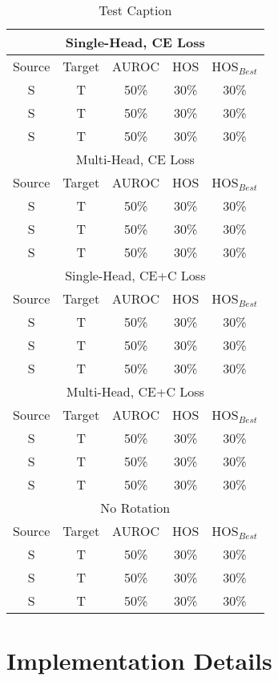 \documentclass[10pt,twocolumn,letterpaper]{article}
\begin{document}
\begin{table}
  \centering
  \begin{tabular}[t]{||c|c|c||c|c||}
    \hline
    \multicolumn{5}{||c||}{Single-Head, CE Loss} \\
    \hline
    Source & Target & AUROC & HOS & HOS$_{Best}$ \\
    S & T & 50\% & 30\% & 30\% \\
    S & T & 50\% & 30\% & 30\% \\
    S & T & 50\% & 30\% & 30\% \\
    \hline
    \hline
    \multicolumn{5}{||c||}{Multi-Head, CE Loss} \\
    \hline
    Source & Target & AUROC & HOS & HOS$_{Best}$ \\
    S & T & 50\% & 30\% & 30\% \\
    S & T & 50\% & 30\% & 30\% \\
    S & T & 50\% & 30\% & 30\% \\
    \hline
    \hline
    \multicolumn{5}{||c||}{Single-Head, CE+C Loss} \\
    \hline
    Source & Target & AUROC & HOS & HOS$_{Best}$ \\
    S & T & 50\% & 30\% & 30\% \\
    S & T & 50\% & 30\% & 30\% \\
    S & T & 50\% & 30\% & 30\% \\
    \hline
    \hline
    \multicolumn{5}{||c||}{Multi-Head, CE+C Loss} \\
    \hline
    Source & Target & AUROC & HOS & HOS$_{Best}$ \\
    S & T & 50\% & 30\% & 30\% \\
    S & T & 50\% & 30\% & 30\% \\
    S & T & 50\% & 30\% & 30\% \\
    \hline 
    \hline
    \multicolumn{5}{||c||}{No Rotation} \\
    \hline
    Source & Target & AUROC & HOS & HOS$_{Best}$ \\
    S & T & 50\% & 30\% & 30\% \\
    S & T & 50\% & 30\% & 30\% \\
    S & T & 50\% & 30\% & 30\% \\
    \hline
  \end{tabular}
  \caption{\label{tab:results}Test Caption}
\end{table}

\section{Implementation Details}
\end{document}
